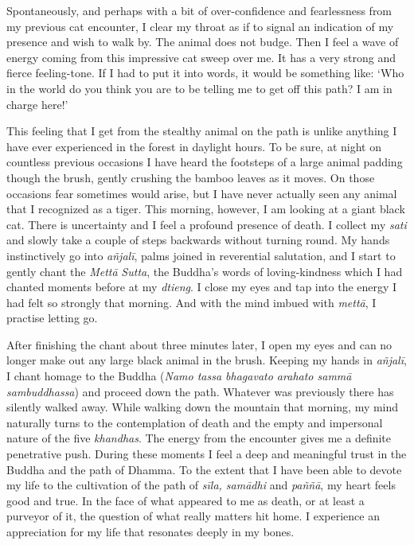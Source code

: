 Spontaneously, and perhaps with a bit of over-confidence and
fearlessness from my previous cat encounter, I clear my throat as if to
signal an indication of my presence and wish to walk by. The animal does
not budge. Then I feel a wave of energy coming from this impressive cat
sweep over me. It has a very strong and fierce feeling-tone. If I had to
put it into words, it would be something like: `Who in the world do you
think you are to be telling me to get off this path? I am in charge
here!'

This feeling that I get from the stealthy animal on the path is unlike
anything I have ever experienced in the forest in daylight hours. To be
sure, at night on countless previous occasions I have heard the
footsteps of a large animal padding though the brush, gently crushing
the bamboo leaves as it moves. On those occasions fear sometimes would
arise, but I have never actually seen any animal that I recognized as a
tiger. This morning, however, I am looking at a giant black cat. There
is uncertainty and I feel a profound presence of death. I collect my
\emph{sati} and slowly take a couple of steps backwards without turning
round. My hands instinctively go into \emph{añjalī}, palms joined in
reverential salutation, and I start to gently chant the \emph{Mettā}
\emph{Sutta}, the Buddha's words of loving-kindness which I had chanted
moments before at my \emph{dtieng}. I close my eyes and tap into the
energy I had felt so strongly that morning. And with the mind imbued
with \emph{mettā}, I practise letting go.

After finishing the chant about three minutes later, I open my eyes and
can no longer make out any large black animal in the brush. Keeping my
hands in \emph{añjalī}, I chant homage to the Buddha (\emph{Namo tassa
bhagavato arahato sammā sambuddhassa}) and proceed down the path.
Whatever was previously there has silently walked away. While walking
down the mountain that morning, my mind naturally turns to the
contemplation of death and the empty and impersonal nature of the five
\emph{khandhas}. The energy from the encounter gives me a definite
penetrative push. During these moments I feel a deep and meaningful
trust in the Buddha and the path of Dhamma. To the extent that I have
been able to devote my life to the cultivation of the path of
\emph{sīla, samādhi} and \emph{paññā}, my heart feels good and true. In
the face of what appeared to me as death, or at least a purveyor of it,
the question of what really matters hit home. I experience an
appreciation for my life that resonates deeply in my bones.

